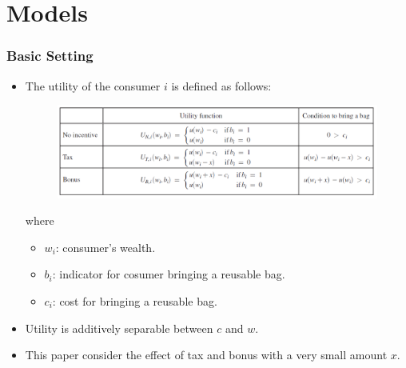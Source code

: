 \documentclass[dvipdfmx,11pt]{beamer}
\begin{document}
\section{Models}
\frame{\sectionpage}

\begin{frame}\frametitle{Basic Setting}
  \begin{itemize}
    \item The utility of the consumer $i$ is defined as follows:
    \begin{figure}[ht]
      \centering
      \includegraphics[scale = .5]{0807tanji/model}
    \end{figure}
    where
    \begin{itemize}
      \item $w_i$: consumer's wealth.
      \item $b_i$: indicator for cosumer bringing a reusable bag.
      \item $c_i$: cost for bringing a reusable bag.
    \end{itemize}
    \item Utility is additively separable between $c$ and $w$.
    \item This paper consider the effect of tax and bonus with a very small amount $x$.
  \end{itemize}
\end{frame}
\end{document}
